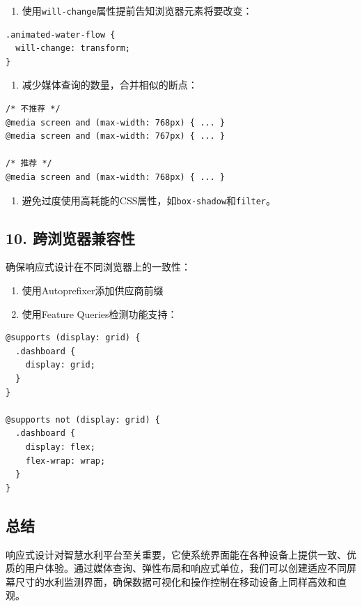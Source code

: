 \begin{enumerate}
\def\labelenumi{\arabic{enumi}.}
\tightlist
\item
  使用\passthrough{\lstinline!will-change!}属性提前告知浏览器元素将要改变：
\end{enumerate}

\begin{lstlisting}
.animated-water-flow {
  will-change: transform;
}
\end{lstlisting}

\begin{enumerate}
\def\labelenumi{\arabic{enumi}.}
\setcounter{enumi}{1}
\tightlist
\item
  减少媒体查询的数量，合并相似的断点：
\end{enumerate}

\begin{lstlisting}
/* 不推荐 */
@media screen and (max-width: 768px) { ... }
@media screen and (max-width: 767px) { ... }

/* 推荐 */
@media screen and (max-width: 768px) { ... }
\end{lstlisting}

\begin{enumerate}
\def\labelenumi{\arabic{enumi}.}
\setcounter{enumi}{2}
\tightlist
\item
  避免过度使用高耗能的CSS属性，如\passthrough{\lstinline!box-shadow!}和\passthrough{\lstinline!filter!}。
\end{enumerate}

\subsection{10.
跨浏览器兼容性}\label{ux8de8ux6d4fux89c8ux5668ux517cux5bb9ux6027}

确保响应式设计在不同浏览器上的一致性：

\begin{enumerate}
\def\labelenumi{\arabic{enumi}.}
\tightlist
\item
  使用Autoprefixer添加供应商前缀
\item
  使用Feature Queries检测功能支持：
\end{enumerate}

\begin{lstlisting}
@supports (display: grid) {
  .dashboard {
    display: grid;
  }
}

@supports not (display: grid) {
  .dashboard {
    display: flex;
    flex-wrap: wrap;
  }
}
\end{lstlisting}

\subsection{总结}\label{ux603bux7ed3}

响应式设计对智慧水利平台至关重要，它使系统界面能在各种设备上提供一致、优质的用户体验。通过媒体查询、弹性布局和响应式单位，我们可以创建适应不同屏幕尺寸的水利监测界面，确保数据可视化和操作控制在移动设备上同样高效和直观。
